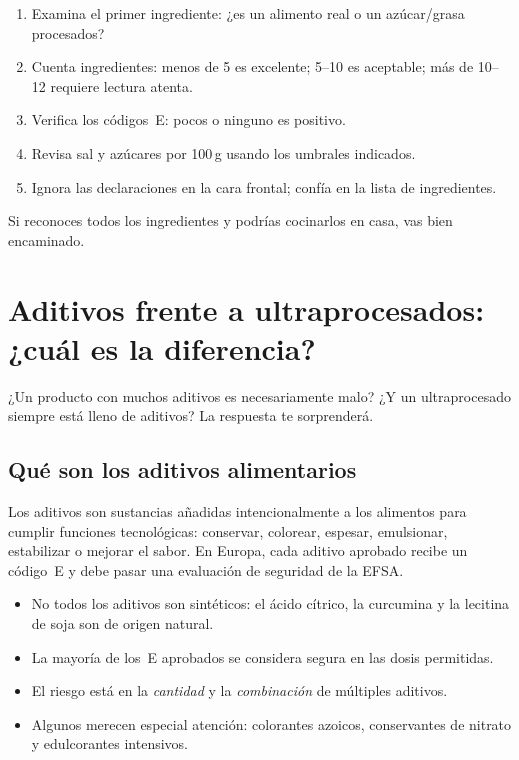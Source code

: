 \documentclass[a5paper,12pt,oneside,openany]{book}
\newcommand{\boxverde}[2]{%
  \begin{tcolorbox}[cajabase,
    colback=verdescuro!8!white, colframe=verdescuro, title={#1}]
  #2\end{tcolorbox}}
\begin{document}
\begin{enumerate}
  \item Examina el primer ingrediente: ¿es un alimento real o un azúcar/grasa
    procesados?
  \item Cuenta ingredientes: menos de 5 es excelente; 5--10 es aceptable; más
    de 10--12 requiere lectura atenta.
  \item Verifica los códigos~E: pocos o ninguno es positivo.
  \item Revisa sal y azúcares por 100\,g usando los umbrales indicados.
  \item Ignora las declaraciones en la cara frontal; confía en la lista de
    ingredientes.
\end{enumerate}

\boxverde{El truco más sencillo}{Si reconoces todos los ingredientes y podrías
cocinarlos en casa, vas bien encaminado.}

\chapter{Aditivos frente a ultraprocesados: ¿cuál es la diferencia?}

¿Un producto con muchos aditivos es necesariamente malo? ¿Y un ultraprocesado
siempre está lleno de aditivos? La respuesta te sorprenderá.

\section{Qué son los aditivos alimentarios}

Los aditivos son sustancias añadidas intencionalmente a los alimentos para cumplir
funciones tecnológicas: conservar, colorear, espesar, emulsionar, estabilizar o
mejorar el sabor. En Europa, cada aditivo aprobado recibe un código~E y debe pasar
una evaluación de seguridad de la EFSA.

\begin{itemize}
  \item No todos los aditivos son sintéticos: el ácido cítrico, la curcumina
    y la lecitina de soja son de origen natural.
  \item La mayoría de los~E aprobados se considera segura en las dosis permitidas.
  \item El riesgo está en la \emph{cantidad} y la \emph{combinación} de múltiples
    aditivos.
  \item Algunos merecen especial atención: colorantes azoicos, conservantes de
    nitrato y edulcorantes intensivos.
\end{itemize}
\end{document}

